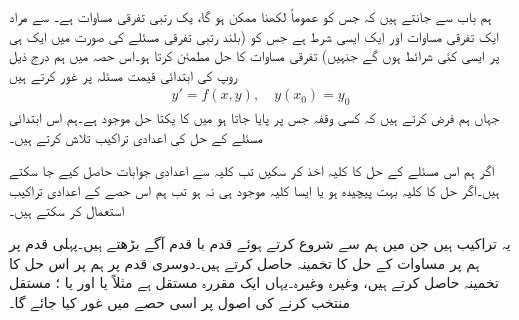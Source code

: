 
ہم باب  سے جانتے ہیں کہ  جس کو عموماً  لکھنا ممکن ہو گا، یک رتبی تفرقی مساوات ہے۔ سے مراد ایک تفرقی مساوات اور ایک ایسی شرط ہے  جس کو (بلند رتبی تفرقی مسئلے کی صورت میں ایک ہی  پر ایسی کئی شرائط ہوں گے جنہیں) تفرقی مساوات کا حل مطمئن کرتا ہو۔اس حصہ میں ہم درج ذیل روپ کی ابتدائی قیمت مسئلہ پر غور کرتے ہیں
\begin{align}\label{مساوات_اعدادی_ابتدائی_مسئلہ_الف}
y'=f(x,y),\quad y(x_0)=y_0
\end{align}
جہاں ہم فرض کرتے ہیں کہ کسی وقفہ جس پر  پایا جاتا ہو میں  کا یکتا حل موجود ہے۔ہم اس ابتدائی مسئلے کے حل کی اعدادی تراکیب تلاش کرتے ہیں۔

اگر ہم اس مسئلے کے حل کا کلیہ اخذ کر سکیں تب کلیہ سے اعدادی جوابات حاصل کیے جا سکتے ہیں۔اگر حل کا کلیہ بہت پیچیدہ ہو یا ایسا کلیہ موجود ہی نہ ہو تب ہم اس حصے کے  اعدادی تراکیب استعمال کر سکتے ہیں۔

یہ تراکیب  ہیں جن میں ہم   سے شروع کرتے ہوئے قدم با قدم آگے بڑھتے ہیں۔پہلی قدم پر ہم   پر مساوات  کے حل  کا تخمینہ  حاصل کرتے ہیں۔دوسری قدم پر ہم   پر اس حل کا تخمینہ  حاصل کرتے ہیں، وغیرہ وغیرہ۔یہاں  ایک مقررہ مستقل ہے مثلاً  یا  اور یا ؛ مستقل  منتخب کرنے کی اصول پر اسی حصے میں غور کیا جائے گا۔

